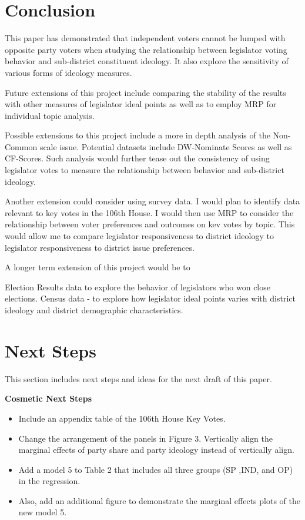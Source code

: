 \documentclass[10pt,letterpaper]{article}
\begin{document}
\newpage


\newpage

\newpage


\section{Conclusion} 
This paper has demonstrated that independent voters cannot be lumped with opposite party voters when studying the relationship between legislator voting behavior and sub-district constituent ideology. It also explore the sensitivity of various forms of ideology measures.

Future extensions of this project include comparing the stability of the results with other measures of legislator ideal points as well as to employ MRP for individual topic analysis.

Possible extensions to this project include a more in depth analysis of the Non-Common scale issue. Potential datasets include DW-Nominate Scores as well as CF-Scores. Such analysis would further tease out the consistency of using legislator votes to measure the relationship between behavior and sub-district ideology.

Another extension could consider using survey data. I would plan to identify data relevant to key votes in the 106th House. I would then use MRP to consider the relationship between voter preferences and outcomes on kev votes by topic. This would allow me to compare legislator responsiveness to district ideology to legislator responsiveness to district issue preferences.


A longer term extension of this project would be to 

Election Results data to explore the behavior of legislators who won close elections.
Census data - to explore how legislator ideal points varies with district ideology and district demographic characteristics. 

\section{Next Steps} 

This section includes next steps and ideas for the next draft of this paper.

\textbf{Cosmetic Next Steps}
\begin{itemize}
\item Include an appendix table of the 106th House Key Votes.
\item Change the arrangement of the panels in Figure 3. Vertically align the marginal effects of party share and party ideology instead of vertically align.
\item Add a model 5 to Table 2 that includes all three groups (SP ,IND, and OP) in the regression.
\item Also, add an additional figure to demonstrate the marginal effects plots of the new model 5.
\end{itemize}
\end{document}
